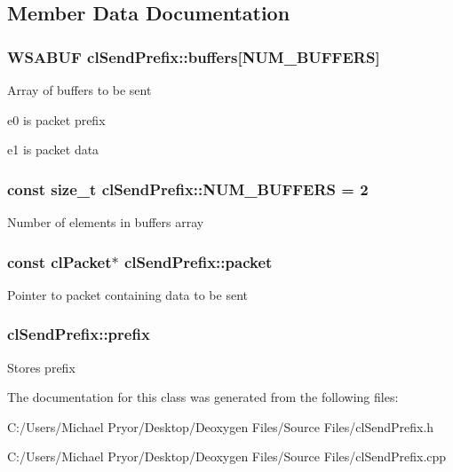 \subsection{Member Data Documentation}
\hypertarget{classcl_send_prefix_ae96577f7b0648d25bd11b447c7678210}{
\subsubsection[{buffers}]{\setlength{\rightskip}{0pt plus 5cm}WSABUF {\bf clSendPrefix::buffers}\mbox{[}{\bf NUM\_\-BUFFERS}\mbox{]}}}
\label{classcl_send_prefix_ae96577f7b0648d25bd11b447c7678210}
Array of buffers to be sent
\begin{DoxyItemize}
\item e0 is packet prefix
\item e1 is packet data 
\end{DoxyItemize}\hypertarget{classcl_send_prefix_a37563065ef429279830e8d7f59fdcfbe}{
\subsubsection[{NUM\_\-BUFFERS}]{\setlength{\rightskip}{0pt plus 5cm}const size\_\-t {\bf clSendPrefix::NUM\_\-BUFFERS} = 2}}
\label{classcl_send_prefix_a37563065ef429279830e8d7f59fdcfbe}
Number of elements in buffers array \hypertarget{classcl_send_prefix_ab888e85e50e8e1418ab8d74928c963da}{
\subsubsection[{packet}]{\setlength{\rightskip}{0pt plus 5cm}const {\bf clPacket}$\ast$ {\bf clSendPrefix::packet}}}
\label{classcl_send_prefix_ab888e85e50e8e1418ab8d74928c963da}
Pointer to packet containing data to be sent \hypertarget{classcl_send_prefix_af5e8144995301e9887ffcd23348d8c7e}{
\subsubsection[{prefix}]{ {\bf clSendPrefix::prefix}}}
\label{classcl_send_prefix_af5e8144995301e9887ffcd23348d8c7e}
Stores prefix 

The documentation for this class was generated from the following files:\begin{DoxyCompactItemize}
\item 
C:/Users/Michael Pryor/Desktop/Deoxygen Files/Source Files/clSendPrefix.h\item 
C:/Users/Michael Pryor/Desktop/Deoxygen Files/Source Files/clSendPrefix.cpp\end{DoxyCompactItemize}
